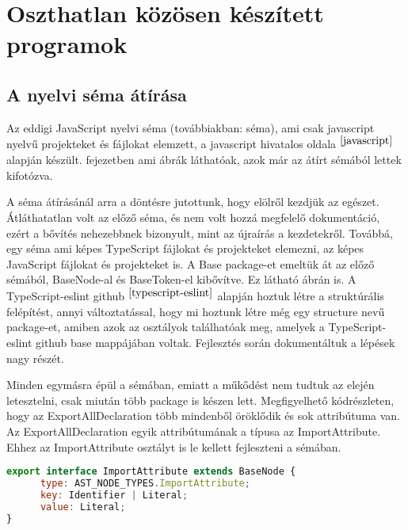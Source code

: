 \chapter{Oszthatlan közösen készített programok}\label{chap:oszthatlan_kozos_dolgok}

\section{A nyelvi séma átírása}

\noindent

Az eddigi JavaScript nyelvi séma (továbbiakban: séma), ami csak javascript nyelvű projekteket és fájlokat elemzett, a javascript hivatalos oldala$^{~\cite{javascript}}$ alapján készült.
 fejezetben ami ábrák láthatóak, azok már az átírt sémából lettek kifotózva.

\noindent

A séma átírásánál arra a döntésre jutottunk, hogy elölről kezdjük az egészet.
Átláthatatlan volt az előző séma, és nem volt hozzá megfelelő dokumentáció, ezért a bővítés nehezebbnek bizonyult, mint az újraírás a kezdetekről.
Továbbá, egy séma ami képes TypeScript fájlokat és projekteket elemezni, az képes JavaScript fájlokat és projekteket is.
A Base package-et emeltük át az előző sémából, BaseNode-al és BaseToken-el kibővítve. Ez látható  ábrán is.
A TypeScript-eslint github$^{~\cite{typescript-eslint}}$ alapján hoztuk létre a struktúrális felépítést,
annyi változtatással, hogy mi hoztunk létre még egy structure nevű package-et, amiben azok az osztályok találhatóak meg, amelyek a TypeScript-eslint github base mappájában voltak.
Fejlesztés során dokumentáltuk a lépések nagy részét.

\noindent

Minden egymásra épül a sémában, emiatt a műkődést nem tudtuk az elején letesztelni, csak miután több package is készen lett.
Megfigyelhető  kódrészleten, hogy az ExportAllDeclaration több mindenből öröklődik és sok attribútuma van.
Az ExportAllDeclaration egyik attribútumának a típusa az ImportAttribute.
Ehhez az ImportAttribute osztályt is le kellett fejleszteni a sémában.

\begin{lstlisting}[caption={ImportAttribute},label={lst:asg_file_import_attribute}, language={JavaScript}]
export interface ImportAttribute extends BaseNode {
      type: AST_NODE_TYPES.ImportAttribute;
      key: Identifier | Literal;
      value: Literal;
}
\end{lstlisting}

